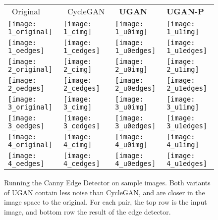 \begin{figure}
\centering
\begin{tabular}{p{1.7cm} p{1.7cm} p{1.7cm} p{1.7cm}}
  
   ~\quad Original & ~CycleGAN & ~\quad \textbf{UGAN} & \quad \textbf{UGAN-P} \\

   \texttt{[image: 1\_original]} &
   \texttt{[image: 1\_cimg]} &
   \texttt{[image: 1\_u0img]} &
   \texttt{[image: 1\_u1img]} \\ [-1ex]
   \texttt{[image: 1\_oedges]} &
   \texttt{[image: 1\_cedges]} &
   \texttt{[image: 1\_u0edges]} &
   \texttt{[image: 1\_u1edges]} \\

   \texttt{[image: 2\_original]} &
   \texttt{[image: 2\_cimg]} &
   \texttt{[image: 2\_u0img]} &
   \texttt{[image: 2\_u1img]} \\ [-1ex]
   \texttt{[image: 2\_oedges]} &
   \texttt{[image: 2\_cedges]} &
   \texttt{[image: 2\_u0edges]} &
   \texttt{[image: 2\_u1edges]} \\

   \texttt{[image: 3\_original]} &
   \texttt{[image: 3\_cimg]} &
   \texttt{[image: 3\_u0img]} &
   \texttt{[image: 3\_u1img]} \\ [-1ex]
   \texttt{[image: 3\_oedges]} &
   \texttt{[image: 3\_cedges]} &
   \texttt{[image: 3\_u0edges]} &
   \texttt{[image: 3\_u1edges]} \\
   
   \texttt{[image: 4\_original]} &
   \texttt{[image: 4\_cimg]} &
   \texttt{[image: 4\_u0img]} &
   \texttt{[image: 4\_u1img]} \\ [-1ex]
   \texttt{[image: 4\_oedges]} &
   \texttt{[image: 4\_cedges]} &
   \texttt{[image: 4\_u0edges]} &
   \texttt{[image: 4\_u1edges]} \\

\end{tabular}
\caption{Running the Canny Edge Detector on sample images. Both variants of UGAN contain less noise than CycleGAN,
and are closer in the image space to the original. For each pair, the top row is the input image, and bottom row
the result of the edge detector.}
\label{fig:canny_samples}
\end{figure}

